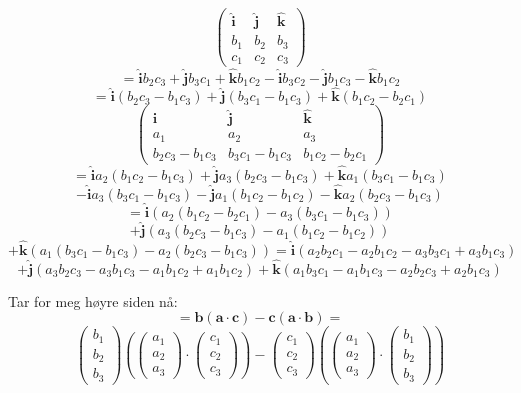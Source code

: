 \documentclass[11pt,a4paper, leqno]{report}
\newcommand{\ihat}{\boldsymbol{\hat{\textbf{i}}}}
\newcommand{\jhat}{\boldsymbol{\hat{\textbf{j}}}}
\newcommand{\khat}{\boldsymbol{\hat{\textbf{k}}}}
\begin{document}
	$$\left( \begin{array}{ccc}
			\ihat &  \jhat &  \khat \\
			b_1  &  b_2  &  b_3 \\
			c_1  &  c_2  &  c_3
	\end{array} \right)$$
	$$=\ihat b_2 c_3 + \jhat b_3 c_1 + \khat b_1 c_2 -\ihat b_3 c_2 -\jhat b_1 c_3 - \khat  b_1 c_2$$
	$$=\ihat(b_2 c_3-b_1 c_3) +\jhat(b_3 c_1-b_1 c_3)+\khat( b_1 c_2- b_2 c_1)$$
	$$\left( \begin{array}{ccc}
			\ihat &  \jhat &  \khat \\
			a_1  &  a_2  &  a_3 \\
			b_2 c_3-b_1 c_3  &  b_3 c_1-b_1 c_3 &  b_1 c_2- b_2 c_1
	\end{array} \right)$$
	$$=\ihat a_2 (b_1 c_2-b_1 c_3) +  \jhat a_3 (b_2 c_3-b_1 c_3) + \khat a_1 (b_3 c_1-b_1 c_3)$$
	$$-\ihat a_3 (b_3 c_1-b_1 c_3) - \jhat a_1( b_1 c_2- b_1 c_2)-\khat  a_2 (b_2 c_3-b_1 c_3 )$$
	$$=\ihat (a_2 (b_1 c_2-b_2 c_1) -a_3 (b_3 c_1-b_1 c_3))$$
	$$+\jhat (a_3 (b_2 c_3-b_1 c_3)-a_1( b_1 c_2- b_1 c_2))$$
	$$+\khat (a_1 (b_3 c_1-b_1 c_3)-a_2 (b_2 c_3-b_1 c_3))=\ihat (a_2 b_2 c_1 - a_2 b_1 c_2 - a_3 b_3 c_1 + a_3 b_1 c_3)$$
	$$+\jhat (a_3 b_2 c_3 - a_3 b_1 c_3 - a_1 b_1 c_2 + a_1 b_1 c_2) + \khat (a_1 b_3 c_1 - a_1 b_1 c_3 - a_2 b_2 c_3 + a_2 b_1 c_3)$$
\newpage

Tar for meg høyre siden nå:
	$$=\mathbf{b}(\mathbf{a}\cdot\mathbf{c})-\mathbf{c}(\mathbf{a}\cdot\mathbf{b})=$$
	$$	\left(\begin{array}{c}
			b_1\\
			b_2\\
			b_3
		\end{array}\right)
		\left(\left(\begin{array}{c}
			a_1\\
			a_2\\
			a_3
		\end{array}\right)\cdot
		\left(\begin{array}{c}
			c_1\\
			c_2\\
			c_3
		\end{array}\right)\right)
			-
		\left(\begin{array}{c}
			c_1\\
			c_2\\
			c_3
		\end{array}\right)
		\left(\left(\begin{array}{c}
			a_1\\
			a_2\\
			a_3
		\end{array}\right)\cdot
		\left(\begin{array}{c}
			b_1\\
			b_2\\
			b_3
		\end{array}\right)\right)	$$
\end{document}
